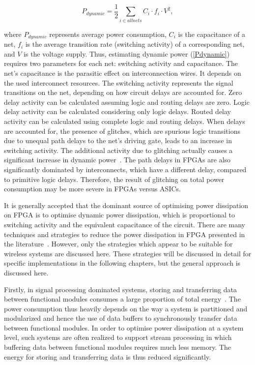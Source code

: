 \begin{center}
\begin{equation}
\label{Pdynamic}
 P_{\mathit{dynamic}} =\frac{1}{2} \sum\limits_{i \in \mathit{all nets}} C_{i} \cdot f_{i} \cdot V^2,
\end{equation}
\end{center}
where $P_{\mathit{dynamic}}$ represents average power consumption, $C_{i}$ is the capacitance of a net, $f_{i}$ is the average transition rate (switching activity) of a corresponding net, and $V$ is the voltage supply.
Thus, estimating dynamic power (\ref{Pdynamic}) requires two parameters for each net: switching activity and capacitance.
The net's capacitance is the parasitic effect on interconnection wires. It depends on the used interconnect resources.
The switching activity represents the signal transitions on the net, depending on how circuit delays are accounted for.
Zero delay activity can be calculated assuming logic and routing delays are zero. Logic delay activity can be calculated considering only logic delays.
Routed delay activity can be calculated using complete logic and routing delays.
When delays are accounted for, the presence of glitches, which are spurious logic transitions due to unequal path delays to the net’s driving gate, leads to an increase in switching activity.
The additional activity due to glitching actually causes a significant increase in dynamic power~\cite{Anderson2004a}.
The path delays in FPGAs are also significantly dominated by interconnects, which have a different delay, compared to primitive logic delays. Therefore, the result of glitching on total power consumption may be more severe in FPGAs versus ASICs.

It is generally accepted that the dominant source of optimising power dissipation on FPGA is to optimise dynamic power dissipation, which is proportional to switching activity and the equivalent capacitance of the circuit.
There are many techniques and strategies to reduce the power dissipation in FPGA presented in the literature~\cite{Danckaert1999,Kovacs2000,Czapski2007,Liu2009,Ahuja2010}.
However, only the strategies which appear to be suitable for wireless systems are discussed here.
These strategies will be discussed in detail for specific implementations in the following chapters, but the general approach is discussed here.

Firstly, in signal processing dominated systems, storing and transferring data between functional modules consumes a large proportion of total energy~\cite{Liu2009}.
The power consumption thus heavily depends on the way a system is partitioned and modularized and hence the use of data buffers to synchronously transfer data between functional modules.
In order to optimise power dissipation at a system level, such systems are often realized to support stream processing in which buffering data between functional modules requires much less memory.
The energy for storing and transferring data is thus reduced significantly.

